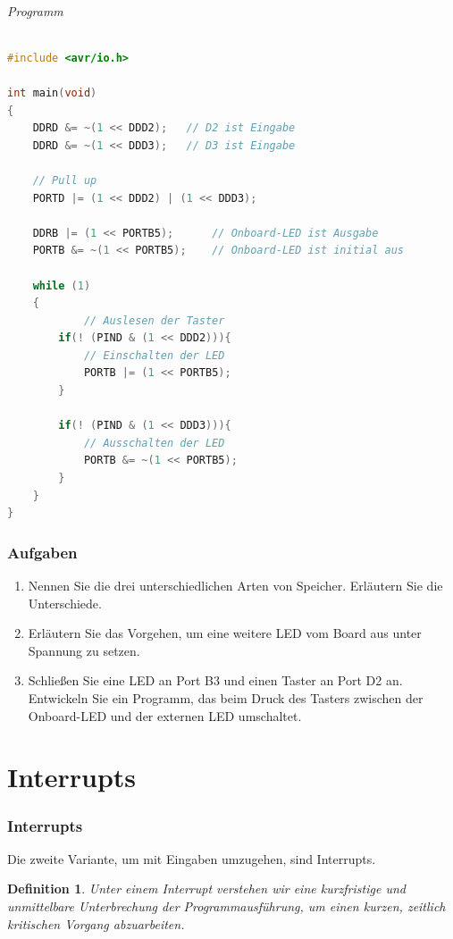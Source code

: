 \documentclass[11pt,a4paper]{scrartcl}
\newtheorem{definition}{Definition}
\begin{document}
\paragraph{Programm} \quad
\begin{lstlisting}[language=C]
#include <avr/io.h>

int main(void)
{
	DDRD &= ~(1 << DDD2);	// D2 ist Eingabe
	DDRD &= ~(1 << DDD3);	// D3 ist Eingabe
	
	// Pull up
	PORTD |= (1 << DDD2) | (1 << DDD3);
	
	DDRB |= (1 << PORTB5);		// Onboard-LED ist Ausgabe
	PORTB &= ~(1 << PORTB5);	// Onboard-LED ist initial aus
	
    while (1) 
    {
    		// Auslesen der Taster
		if(! (PIND & (1 << DDD2))){
			// Einschalten der LED			
			PORTB |= (1 << PORTB5);
		}
		
		if(! (PIND & (1 << DDD3))){
			// Ausschalten der LED			
			PORTB &= ~(1 << PORTB5);
		}
    }
}

\end{lstlisting}
\section*{Aufgaben}
\begin{enumerate}
\item Nennen Sie die drei unterschiedlichen Arten von Speicher. Erläutern Sie die Unterschiede.
\item Erläutern Sie das Vorgehen, um eine weitere LED vom Board aus unter Spannung zu setzen.
\item Schließen Sie eine LED an Port B3 und einen Taster an Port D2 an. Entwickeln Sie ein Programm, das beim Druck des Tasters zwischen der Onboard-LED und der externen LED umschaltet.
\end{enumerate}
\part{Interrupts}
\section{Interrupts}
Die zweite Variante, um mit Eingaben umzugehen, sind Interrupts. \\
\begin{definition}
Unter einem Interrupt verstehen wir eine kurzfristige und unmittelbare Unterbrechung der Programmausführung, um einen kurzen, zeitlich kritischen Vorgang abzuarbeiten.
\end{definition}
\end{document}
